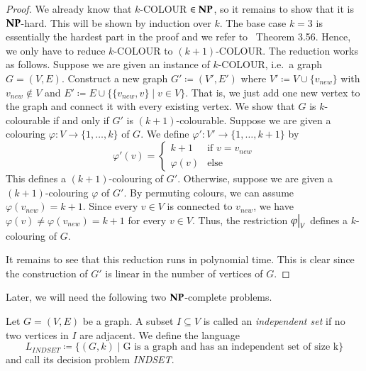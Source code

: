 \begin{proof}
 We already know that $k$-COLOUR $\in \mathbf{NP}$, so it remains to show that it is $\mathbf{NP}$-hard.
 This will be shown by induction over $k$.
 The base case $k = 3$ is essentially the hardest part in the proof and we refer to~\cite{JorgRothe2008} Theorem 3.56.
 Hence, we only have to reduce $k$-COLOUR to $(k+1)$-COLOUR. The reduction works as follows.
 Suppose we are given an instance of $k$-COLOUR, i.e.\
 a graph $G = (V,E)$. Construct a new graph $G' \coloneqq (V', E')$ where $V' \coloneqq V \cup \lbrace v_{new} \rbrace$ with
 $v_{new} \notin V$ and $E' \coloneqq E \cup \lbrace \lbrace v_{new}, v \rbrace \; | \; v \in V \rbrace$. That is,
 we just add one new vertex to the graph
 and connect it with every existing vertex. We show that $G$ is $k$-colourable if and only if $G'$ is $(k+1)$-colourable.
 Suppose we are given a colouring $\varphi \colon V \to {\lbrace 1,\ldots,k \rbrace}$ of $G$. We define 
 $\varphi' \colon V' \to { \lbrace 1, \ldots, k+1 \rbrace }$
 by 
 $$ \varphi'(v) = \begin{cases}
                   k + 1 &\text{if $v = v_{new}$} \\
                   \varphi(v) &\text{else}
                  \end{cases}
$$
 This defines a $(k+1)$-colouring of $G'$. 
 Otherwise, suppose we are given a $(k+1)$-colouring $\varphi$ of $G'$. By permuting colours, we can assume
 $\varphi (v_{new}) = k+1$. Since every $v \in V$ is connected to $v_{new}$, we have 
 $\varphi(v) \neq \varphi(v_{new}) = k+1$ for every $v \in V$. 
 Thus, the restriction $\restr{\varphi}{V}$ defines a $k$-colouring of $G$.
 
 It remains to see that this reduction runs in polynomial time. This is clear since
 the construction of $G'$ is linear in the number of vertices of $G$.
 
\end{proof}

Later, we will need the following two $\mathbf{NP}$-complete problems.

\begin{Problem}
 Let $G = (V,E)$ be a graph. A subset $I \subseteq V$ is called an \emph{independent set} if no two vertices in $I$
 are adjacent. We define the language
  $$L_{INDSET} \coloneqq \lbrace (G,k) \; | \; \text{G is a graph and has an independent set of size k} \rbrace $$
  and call its decision problem \emph{INDSET}.
\end{Problem}

